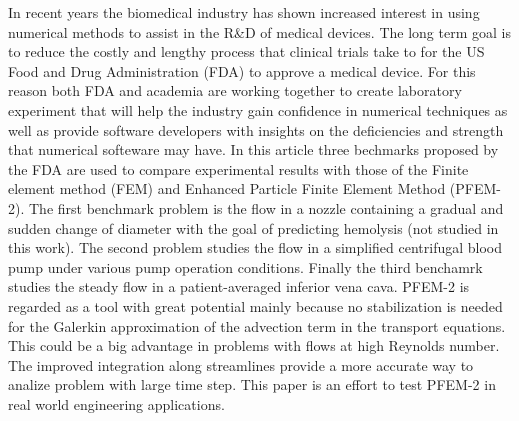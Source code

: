 In recent years the biomedical industry has shown increased interest in using numerical methods to assist in the R\&D of medical devices. The long term goal is to reduce the costly and lengthy process that clinical trials take to for the US Food and Drug Administration (FDA) to approve a medical device. For this reason both FDA and academia are working together to create laboratory experiment that will help the industry gain confidence in numerical techniques as well as provide software developers with insights on the deficiencies and strength that numerical softeware may have. In this article three bechmarks proposed by the FDA are used to compare experimental results with those of the Finite element method (FEM) and Enhanced Particle Finite Element Method (PFEM-2). The first benchmark problem is the flow in a nozzle
containing a gradual and sudden change of diameter with the goal of predicting hemolysis (not studied in this work). The second problem studies the flow in a simplified centrifugal
blood pump under various pump operation conditions. Finally the third benchamrk studies the steady flow in a patient-averaged inferior vena cava. PFEM-2 is regarded as a tool with great potential mainly because no stabilization is needed for the Galerkin approximation of the advection term in the transport equations. This could be a big advantage in problems with flows at high Reynolds number. The improved integration along streamlines provide a more accurate way to analize problem with large time step. This paper is an effort to test PFEM-2 in real world engineering applications.
